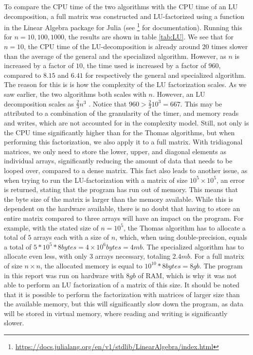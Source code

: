 \documentclass[a4paper,10pt,English]{article}
\begin{document}
To compare the CPU time of the two algorithms with the CPU time of an LU decomposition, a full matrix was constructed and LU-factorized using a function in the Linear Algebra package for Julia (see \footnote{\url{https://docs.julialang.org/en/v1/stdlib/LinearAlgebra/index.html}} for documentation). Running this for $n = 10, 100, 1000$, the results are shown in table \ref{tab:LU}. We see that for $n=10$, the CPU time of the LU-decomposition is already around 20 times slower than the average of the general and the specialized algorithm. However, as $n$ is increased by a factor of $10$, the time used is increased by a factor of $960$, compared to $8.15$ and $6.41$ for respectively the general and specialized algorithm. The reason for this is is how the complexity of the LU factorization scales. As we saw earlier, the two algorithms both scales with $n$. However, an LU decomposition scales as $\frac{2}{3}n^3$ \cite{Golub1996}. Notice that $960 > \frac{2}{3}10^3 = 667$. This may be attributed to a combination of the granularity of the timer, and memory reads and writes, which are not accounted for in the complexity model. Still, not only is the CPU time significantly higher than for the Thomas algorithms, but when performing this factorization, we also apply it to a full matrix. With tridiagonal matrices, we only need to store the lower, upper, and diagonal elements as individual arrays, significantly reducing the amount of data that needs to be looped over, compared to a dense matrix. This fact also leads to another issue, as when trying to run the LU-factorization with a matrix of size $10^5 \times 10^5$, an error is returned, stating that the program has run out of memory. This means that the byte size of the matrix is larger than the memory available. While this is dependent on the hardware available, there is no doubt that having to store an entire matrix compared to three arrays will have an impact on the program. For example, with the stated size of $n=10^5$, the Thomas algorithm has to allocate a total of $5$ arrays each with a size of $n$, which, when using double-precision, equals a total of $5*10^5*8bytes = 4 \times 10^6 bytes = 4mb$. The specialized algorithm has to allocate even less, with only $3$ arrays necessary, totaling $2.4mb$. For a full matrix of size $n \times n$, the allocated memory is equal to $10^{10}*8bytes = 8gb$. The program in this report was run on hardware with $8gb$ of RAM, which is why it was not able to perform an LU factorization of a matrix of this size. It should be noted that it is possible to perform the factorization with matrices of larger size than the available memory, but this will significantly slow down the program, as data will be stored in virtual memory, where reading and writing is significantly slower.
\end{document}
